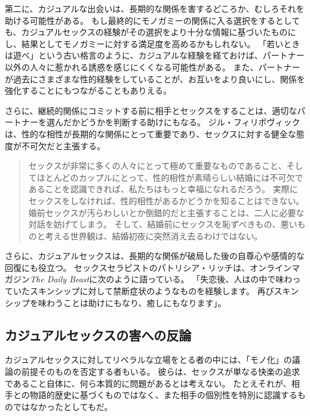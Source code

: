 \documentclass[paper=a4,book,openany]{jlreq}
\begin{document}
第二に、カジュアルな出会いは、長期的な関係を害するどころか、むしろそれを助ける可能性がある。
もし最終的にモノガミーの関係に入る選択をするとしても、カジュアルセックスの経験がその選択をより十分な情報に基づいたものにし、結果としてモノガミーに対する満足度を高めるかもしれない。
「若いときは遊べ」という古い格言のように、カジュアルな経験を経ておけば、パートナー以外の人々に惹かれる誘惑を感じにくくなる可能性がある。
また、パートナーが過去にさまざまな性的経験をしていることが、お互いをより良いにし、関係を強化することにもつながることもありえる。

さらに、継続的関係にコミットする前に相手とセックスをすることは、適切なパートナーを選んだかどうかを判断する助けにもなる。
ジル・フィリポヴィックは、性的な相性が長期的な関係にとって重要であり、セックスに対する健全な態度が不可欠だと主張する。

\begin{quote}
  セックスが非常に多くの人々にとって極めて重要なものであること、そしてほとんどのカップルにとって、性的相性が素晴らしい結婚には不可欠であることを認識できれば、私たちはもっと幸福になれるだろう。
実際にセックスをしなければ、性的相性があるかどうかを知ることはできない。
婚前セックスが汚らわしいとか倒錯的だと主張することは、二人に必要な対話を妨げてしまう。
そして、結婚前にセックスを恥ずべきもの、悪いものと考える世界観は、結婚初夜に突然消え去るわけではない。
\citep{filipovic12:_moral_case_sex_marr}
\end{quote}

さらに、カジュアルセックスは、長期的な関係が破局した後の自尊心や感情的な回復にも役立つ。
セックスセラピストのパトリシア・リッチは、オンラインマガジン\emph{The Daily Beast}に次のように語っている。
「失恋後、人はの中で味わっていたスキンシップに対して禁断症状のようなものを経験します。
再びスキンシップを味わうことは助けにもなり、癒しにもなります」\citep{shire14:_peop_who_have}。

\subsection{カジュアルセックスの害への反論}

カジュアルセックスに対してリベラルな立場をとる者の中には、「モノ化」の議論の前提そのものを否定する者もいる。
彼らは、セックスが単なる快楽の追求であること自体に、何ら本質的に問題があるとは考えない。
たとえそれが、相手との物語的歴史に基づくものではなく、また相手の個別性を特別に認識するものではなかったとしてもだ。
\end{document}
